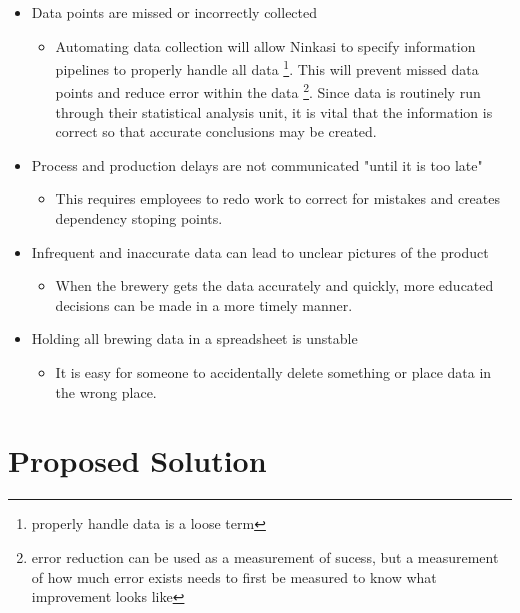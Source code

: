 \documentclass[draftclsnofoot,onecolumn,letterpaper,10pt]{IEEEtran}
\begin{document}
\begin{itemize}
		\item {Data points are missed or incorrectly collected}
      \begin{itemize}
			\item {Automating data collection will allow Ninkasi to specify information pipelines to properly handle all data \footnote{properly handle data is a loose term}. This will prevent missed data points and reduce error within the data \footnote{error reduction can be used as a measurement of sucess, but a measurement of how much error exists needs to first be measured to know what improvement looks like}. Since data is routinely run through their statistical analysis unit, it is vital that the information is correct so that accurate conclusions may be created.}
      \end{itemize}

		\item {Process and production delays are not communicated "until it is too late"}
			\begin{itemize}
			\item {This requires employees to redo work to correct for mistakes and creates dependency stoping points.}
			\end{itemize}

		\item {Infrequent and inaccurate data can lead to unclear pictures of the product}
			\begin{itemize}
			\item {When the brewery gets the data accurately and quickly, more educated decisions can be made in a more timely manner.}
			\end{itemize}

			\item {Holding all brewing data in a spreadsheet is unstable}
				\begin{itemize}
				\item {It is easy for someone to accidentally delete something or place data in the wrong place.}
				\end{itemize}

	\end{itemize}


\section{\textbf{Proposed Solution}}
\end{document}
